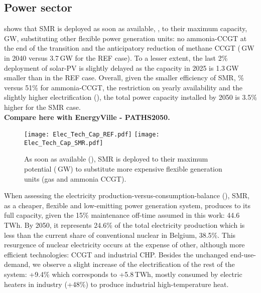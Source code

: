 \subsection{Power sector}
\label{subsec:atom_mol:results_deter_power_sector}
 shows that \gls{SMR} is deployed as soon as available, , to their maximum capacity, \,GW, substituting other flexible power generation units: no ammonia-\gls{CCGT} at the end of the transition and the anticipatory reduction of methane \gls{CCGT} (\,GW in 2040 versus 3.7\,GW for the REF case). To a lesser extent, the last 2\% deployment of solar-\gls{PV} is slightly delayed as the capacity in 2025 is 1.3\,GW smaller than in the REF case. Overall, given the smaller efficiency of \gls{SMR}, \% versus 51\% for ammonia-\gls{CCGT}, the restriction on yearly availability and the slightly higher electrification (), the total power capacity installed by 2050 is 3.5\% higher for the SMR case.\\

{\color{red} \textbf{Compare here with EnergyVille - PATHS2050.}}\\

\begin{figure}[htbp!]
\centering
\texttt{[image: Elec\_Tech\_Cap\_REF.pdf]}
\texttt{[image: Elec\_Tech\_Cap\_SMR.pdf]}
\caption{As soon as available (), \acrfull{SMR} is deployed to their maximum potential (\,GW) to substitute more expensive flexible generation units (\ie gas and ammonia \gls{CCGT}).}
\label{fig:results_deter_tech_cap_elec}
\end{figure}

When assessing the electricity production-versus-consumption-balance (), \gls{SMR}, as a cheaper, flexible and low-emitting power generation system, produces to its full capacity, given the 15\% maintenance off-time assumed in this work: 44.6\,TWh. By 2050, it represents 24.6\% of the total electricity production which is less than the current share of conventional nuclear in Belgium, 38.5\%. This resurgence of nuclear electricity occurs at the expense of other, although more efficient technologies: \gls{CCGT} and industrial \gls{CHP}. Besides the unchanged end-use-demand, we observe a slight increase of the electrification of the rest of the system: +9.4\% which corresponds to +5.8\,TWh, mostly consumed by electric heaters in industry (+48\%) to produce industrial high-temperature heat.

